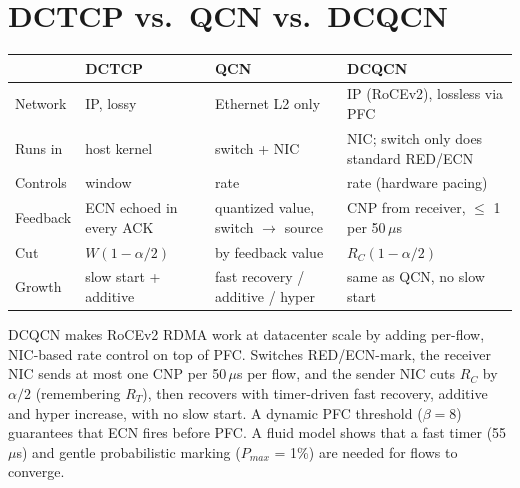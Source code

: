 \section{DCTCP vs.\ QCN vs.\ DCQCN}
\begin{center}
\small
\begin{tabularx}{\linewidth}{@{}lXXX@{}}
\toprule
 & \textbf{DCTCP} & \textbf{QCN} & \textbf{DCQCN}\\
\midrule
Network & IP, lossy & Ethernet L2 only & IP (RoCEv2), lossless via PFC\\
Runs in & host kernel & switch + NIC & NIC; switch only does standard RED/ECN\\
Controls & window & rate & rate (hardware pacing)\\
Feedback & ECN echoed in every ACK & quantized value, switch $\to$ source & CNP from receiver, $\le$ 1 per 50\,$\mu$s\\
Cut & $W(1-\alpha/2)$ & by feedback value & $R_C(1-\alpha/2)$\\
Growth & slow start + additive & fast recovery / additive / hyper & same as QCN, no slow start\\
\bottomrule
\end{tabularx}
\end{center}

\begin{keybox}
DCQCN makes RoCEv2 RDMA work at datacenter scale by adding per-flow, NIC-based rate control on top of PFC. Switches RED/ECN-mark,
the receiver NIC sends at most one CNP per 50\,$\mu$s per flow, and the sender NIC cuts $R_C$ by $\alpha/2$ (remembering $R_T$), then recovers
with timer-driven fast recovery, additive and hyper increase, with no slow start. A dynamic PFC threshold ($\beta = 8$) guarantees that ECN fires
before PFC. A fluid model shows that a fast timer (55\,$\mu$s) and gentle probabilistic marking ($P_{max}$ = 1\%) are needed for flows to converge.
\end{keybox}

